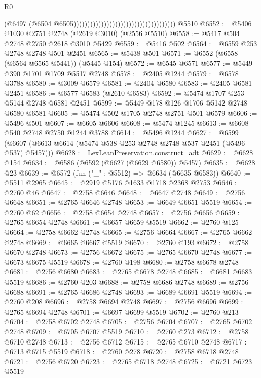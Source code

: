 \begin{lexlean}{R0}
\begin{coremodule}
                                                                          (@6497
                                                                            (@6504
                                                                              @6505)))))))))))))))))))))))))))))))))))))
    @5510
@6552 := @5406 @1030 @2751 @2748 (@2619 @3010) (@2556 @5510)
@6558 := @5417 @504 @2748 @2750 @2618 @3010 @5429
@6559 := @5416 @502
@6564 := @6559 @253 @2748 @2748 @501 @2451
@6565 := @5438 @501
@6571 := @6552 (@6558 (@6564 @6565 @5441)) (@5445 @154)
@6572 := @6545 @6571
@6577 := @5449 @390 @1701 @1709 @5517 @2748
@6578 := @2405 @1244
@6579 := @6578 @3788
@6580 := @3009 @6579
@6581 := @2404 @6580
@6583 := @2405 @6581 @2451
@6586 := @6577 @6583 (@2610 @6583)
@6592 := @5474 @1707 @253 @5144 @2748 @6581 @2451
@6599 := @5449 @178 @126 @1706 @5142 @2748 @6580 @6581
@6605 := @5474 @502 @1705 @2748 @2751 @501 @6579
@6606 := @5496 @501
@6607 := @6605 @6606
@6608 := @5474 @1245
@6613 := @6608 @540 @2748 @2750 @1244 @3788
@6614 := @5496 @1244
@6627 := @6599 (@6607 (@6613 @6614 (@5474 @538 @253 @2748 @2748 @537 @2451 (@5496 @537) @5457)))
@6628 := LexLeanPreservation.construct_adt
@6629 := @6628 @154
@6634 := @6586 (@6592 (@6627 (@6629 @6580)) @5457)
@6635 := @6628 @23
@6639 := @6572 (fun ("_" : @5512) => @6634 (@6635 @6583))
@6640 := @5511 @2965
@6645 := @2919 @5176 @1633 @1718 @2368 @2753
@6646 := @2760 @46
@6647 := @2758 @6646
@6648 := @6647 @2748
@6649 := @2756 @6648
@6651 := @2765 @6646 @2748
@6653 := @6649 @6651 @5519
@6654 := @2760 @62
@6656 := @2758 @6654 @2748
@6657 := @2756 @6656
@6659 := @2765 @6654 @2748
@6661 := @6657 @6659 @5519
@6662 := @2760 @125
@6664 := @2758 @6662 @2748
@6665 := @2756 @6664
@6667 := @2765 @6662 @2748
@6669 := @6665 @6667 @5519
@6670 := @2760 @193
@6672 := @2758 @6670 @2748
@6673 := @2756 @6672
@6675 := @2765 @6670 @2748
@6677 := @6673 @6675 @5519
@6678 := @2760 @198
@6680 := @2758 @6678 @2748
@6681 := @2756 @6680
@6683 := @2765 @6678 @2748
@6685 := @6681 @6683 @5519
@6686 := @2760 @203
@6688 := @2758 @6686 @2748
@6689 := @2756 @6688
@6691 := @2765 @6686 @2748
@6693 := @6689 @6691 @5519
@6694 := @2760 @208
@6696 := @2758 @6694 @2748
@6697 := @2756 @6696
@6699 := @2765 @6694 @2748
@6701 := @6697 @6699 @5519
@6702 := @2760 @213
@6704 := @2758 @6702 @2748
@6705 := @2756 @6704
@6707 := @2765 @6702 @2748
@6709 := @6705 @6707 @5519
@6710 := @2760 @273
@6712 := @2758 @6710 @2748
@6713 := @2756 @6712
@6715 := @2765 @6710 @2748
@6717 := @6713 @6715 @5519
@6718 := @2760 @278
@6720 := @2758 @6718 @2748
@6721 := @2756 @6720
@6723 := @2765 @6718 @2748
@6725 := @6721 @6723 @5519

\end{coremodule}
\end{lexlean}
